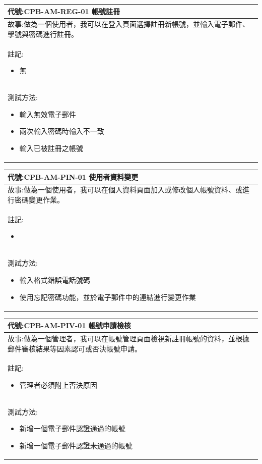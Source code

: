 \documentclass{article}
\begin{document}
\begin{table}[H]
    \begin{tabular}{| m{13cm} |}
		\hline
	代號:CPB-AM-REG-01	帳號註冊	\\ \hline
	故事:做為一個使用者，我可以在登入頁面選擇註冊新帳號，並輸入電子郵件、學號與密碼進行註冊。		\\	\hline
	註記:	
	\begin{itemize}
		\item 無
	\end{itemize}		\\ \hline
	測試方法:	
	\begin{itemize}
		\item 輸入無效電子郵件
		\item 兩次輸入密碼時輸入不一致
		\item 輸入已被註冊之帳號
	\end{itemize}
	\\	\hline
    \end{tabular}
\end{table}

\begin{table}[H]
    \begin{tabular}{| m{13cm} |}
		\hline
	代號:CPB-AM-PIN-01	使用者資料變更	\\ \hline
	故事:做為一個使用者，我可以在個人資料頁面加入或修改個人帳號資料、或進行密碼變更作業。		\\	\hline
	註記:	
	\begin{itemize}
		\item 
	\end{itemize}		\\ \hline
	測試方法:	
	\begin{itemize}
		\item 輸入格式錯誤電話號碼
		\item 使用忘記密碼功能，並於電子郵件中的連結進行變更作業
	\end{itemize}
	\\	\hline
    \end{tabular}
\end{table}

\begin{table}[H]
    \begin{tabular}{| m{13cm} |}
		\hline
	代號:CPB-AM-PIV-01	帳號申請檢核	\\ \hline
	故事:做為一個管理者，我可以在帳號管理頁面檢視新註冊帳號的資料，並根據郵件審核結果等因素認可或否決帳號申請。		\\	\hline
	註記:
	\begin{itemize}
		\item 管理者必須附上否決原因
	\end{itemize}		\\ \hline
	測試方法:	
	\begin{itemize}
		\item 新增一個電子郵件認證通過的帳號
		\item 新增一個電子郵件認證未通過的帳號
	\end{itemize}
	\\	\hline
    \end{tabular}
\end{table}
\end{document}
